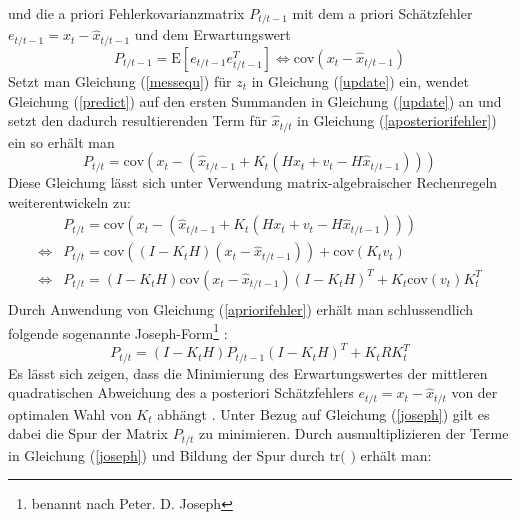 \documentclass[12pt,a4paper,headsepline,bibliography=totoc,listof=totoc,headinclude=false,footinclude=false,BCOR5mm]{scrreprt} %
\begin{document}
  und die a priori Fehlerkovarianzmatrix $P_{t/t-1}$ mit dem a priori Sch{\"a}tzfehler $e_{t/t-1} = x_t -  \hat{x}_{t/t-1}$ und dem Erwartungswert  \begin{equation} \label{apriorifehler} P_{t/t-1}=\text{E}[e_{t/t-1} e_{t/t-1}^T]\Leftrightarrow \text{cov}(x_t -  \hat{x}_{t/t-1}) \end{equation} Setzt man Gleichung (\ref{messequ}) f{\"u}r $z_{t}$ in Gleichung (\ref{update}) ein, wendet Gleichung (\ref{predict}) auf den ersten Summanden in Gleichung (\ref{update}) an und setzt den dadurch resultierenden Term f{\"u}r $\hat{x}_{t/t}$ in Gleichung (\ref{aposteriorifehler}) ein so erh{\"a}lt man
\begin{equation}\label{herleitung} P_{t/t}=\text{cov}\left(x_t - \left( \hat{x}_{t/t-1} + K_{t}\left(H x_{t} +v_{t} - H  \hat{x}_{t/t-1} \right)\right)\right)  \end{equation}
Diese Gleichung l{\"a}sst sich unter Verwendung matrix-algebraischer Rechenregeln \cite[S. 10]{Sorenson1970}\cite[S. 39ff.]{Kalman1960}\cite[S. 3]{Welch2006}  weiterentwickeln zu: 
 \begin{equation}\label{herl}\begin{split}
& P_{t/t}=\text{cov}\left(x_t - \left( \hat{x}_{t/t-1} + K_{t}\left(H x_{t} +v_{t} - H  \hat{x}_{t/t-1} \right)\right)\right)\\
\Leftrightarrow & P_{t/t}=\text{cov}\left(\left(I - K_{t}H\right)\left(x_t - \hat{x}_{t/t-1}\right)\right)+ \text{cov}\left(K_{t}v_{t}\right)\\
\Leftrightarrow & P_{t/t}=\left(I - K_{t}H\right)\text{cov}\left(x_t - \hat{x}_{t/t-1}\right)\left(I - K_{t}H\right)^{T}+ K_{t}\text{cov}\left(v_{t}\right)K_{t}^{T}\\
\end{split} \end{equation} 
Durch Anwendung von Gleichung (\ref{apriorifehler}) erh{\"a}lt man schlussendlich folgende sogenannte Joseph-Form\footnote{benannt nach Peter. D. Joseph} \cite[S. 136]{Mohinder2008}:
\begin{equation}\label{joseph} P_{t/t}=\left(I - K_{t}H\right) P_{t/t-1} \left(I - K_{t}H\right)^{T}+ K_{t} R K_{t}^{T} \end{equation}
Es l{\"a}sst sich zeigen, dass die Minimierung des Erwartungswertes der mittleren quadratischen Abweichung  des a posteriori Sch{\"a}tzfehlers $e_{t/t} = x_t -  \hat{x}_{t/t}$ von der optimalen Wahl von $K_t$ abh{\"a}ngt  \cite[S. 10]{Sorenson1970}\cite[S. 39ff.]{Kalman1960}\cite[S. 3]{Welch2006}. Unter Bezug auf Gleichung (\ref{joseph}) gilt es dabei die Spur der Matrix  $P_{t/t}$ zu minimieren. Durch ausmultiplizieren der Terme in Gleichung (\ref{joseph}) und Bildung der Spur durch $\text{tr( )}$ erh{\"a}lt man: 
\end{document}
